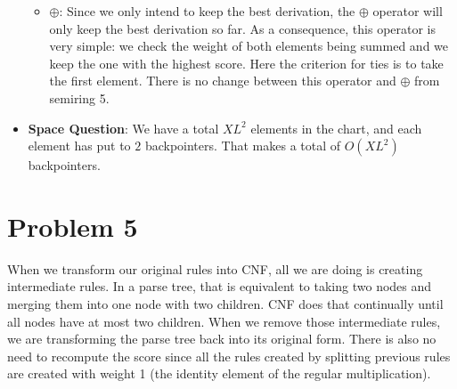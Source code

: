 \documentclass{article}
\begin{document}
\begin{spacing}{1.1}
\begin{itemize}
\begin{itemize}
\begin{itemize}
		\end{itemize}
		\item $\oplus$: Since we only intend to keep the best derivation, the $\oplus$ operator will only keep the best derivation so far. As a consequence, this operator is very simple: we check the weight of both elements being summed and we keep the one with the highest score. Here the criterion for ties is to take the first element. There is no change between this operator and $\oplus$ from semiring 5.
	\end{itemize}
	\item {\bf Space Question}: We have a total $XL^2$ elements in the chart, and each element has put to $2$ backpointers. That makes a total of $O(XL^2)$ backpointers.
\end{itemize}

\section{Problem 5}

When we transform our original rules into CNF, all we are doing is creating intermediate rules. In a parse tree, that is equivalent to taking two nodes and merging them into one node with two children. CNF does that continually until all nodes have at most two children. When we remove those intermediate rules, we are transforming the parse tree back into its original form. There is also no need to recompute the score since all the rules created by splitting previous rules are created with weight 1 (the identity element of the regular multiplication).


\end{spacing}
\end{document}
